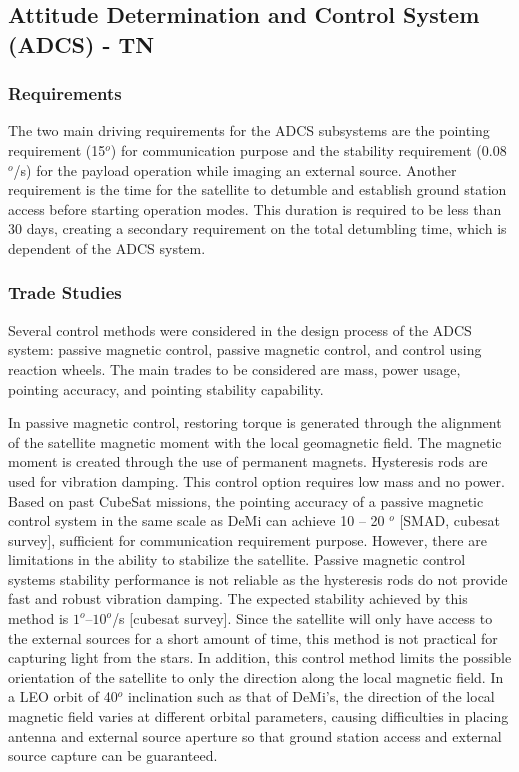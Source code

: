 \documentclass[12pt]{article}
\begin{document}

		\subsection{Attitude Determination and Control System (ADCS) - TN} 
			\subsubsection{Requirements}
		
				The two main driving requirements for the ADCS subsystems are the 			pointing requirement (15$^o$) for communication purpose and the stability requirement (0.08$^o$/s) for the payload operation while imaging an external source. Another requirement is the time for the satellite to detumble and establish ground station access before starting operation modes. This duration is required to be less than 30 days, creating a secondary requirement on the total detumbling time, which is dependent of the ADCS system. 
			\subsubsection{Trade Studies}
			Several control methods were considered in the design process of the ADCS system: passive magnetic control, passive magnetic control, and control using reaction wheels. The main trades to be considered are mass, power usage, pointing accuracy, and pointing stability capability. 

In passive magnetic control, restoring torque is generated through the alignment of the satellite magnetic moment with the local geomagnetic field. The magnetic moment is created through the use of permanent magnets. Hysteresis rods are used for vibration damping. This control option requires low mass and no power. Based on past CubeSat missions, the pointing accuracy of a passive magnetic control system in the same scale as DeMi can achieve 10 – 20 $^o$ [SMAD, cubesat survey], sufficient for communication requirement purpose. However, there are limitations in the ability to stabilize the satellite. Passive magnetic control systems stability performance is not reliable as the hysteresis rods do not provide fast and robust vibration damping. The expected stability achieved by this method is $1^o – 10 ^o$/s [cubesat survey]. Since the satellite will only have access to the external sources for a short amount of time, this method is not practical for capturing light from the stars. In addition, this control method limits the possible orientation of the satellite to only the direction along the local magnetic field. In a LEO orbit of 40$^o$ inclination such as that of DeMi’s, the direction of the local magnetic field varies at different orbital parameters, causing difficulties in placing antenna and external source aperture so that ground station access and external source capture can be guaranteed. 
\end{document}
